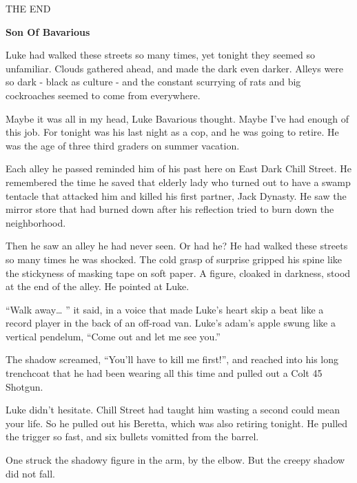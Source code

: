 THE END 
 





{\bf Son Of Bavarious}



Luke had walked these streets so many times, yet tonight they
seemed so unfamiliar. Clouds gathered ahead, and made the dark even
darker. Alleys were so dark - black as culture - and the constant
scurrying of rats and big cockroaches seemed to come from
everywhere.



Maybe it was all in my head, Luke Bavarious thought. Maybe I've had
enough of this job. For tonight was his last night as a cop, and he
was going to retire. He was the age of three third graders on
summer vacation.



Each alley he passed reminded him of his past here on East Dark
Chill Street. He remembered the time he saved that elderly lady who
turned out to have a swamp tentacle that attacked him and killed
his first partner, Jack Dynasty. He saw the mirror store that had
burned down after his reflection tried to burn down the
neighborhood.



Then he saw an alley he had never seen. Or had he? He had walked
these streets so many times he was shocked. The cold grasp of
surprise gripped his spine like the stickyness of masking tape on
soft paper. A figure, cloaked in darkness, stood at the end of the
alley. He pointed at Luke.



``Walk away{\ldots} '' it said, in a voice that made Luke's heart skip a
beat like a record player in the back of an off-road van. Luke's
adam's apple swung like a vertical pendelum, ``Come out and let me
see you.''



The shadow screamed, ``You'll have to kill me first!'', and reached
into his long trenchcoat that he had been wearing all this time and
pulled out a Colt 45 Shotgun.



Luke didn't hesitate. Chill Street had taught him wasting a second
could mean your life. So he pulled out his Beretta, which was also
retiring tonight. He pulled the trigger so fast, and six bullets
vomitted from the barrel.



One struck the shadowy figure in the arm, by the elbow. But the
creepy shadow did not fall.



